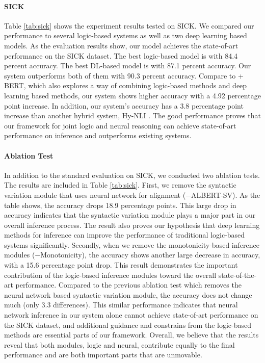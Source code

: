 \documentclass[11pt,a4paper]{article}
\begin{document}
\paragraph{SICK}
Table \ref{tab:sick} shows the experiment results tested on SICK. We compared our performance to several logic-based systems as well as two deep learning based models. As the evaluation results show, our model achieves the state-of-art performance on the SICK dataset. The best logic-based model is \citet{abzianidze-2020-learning} with 84.4 percent accuracy. The best DL-based model is \citet{yin-schutze-2017-task} with 87.1 percent accuracy. Our system outperforms both of them with 90.3 percent accuracy. Compare to \citet{hu-etal-2020-monalog} + BERT, which also explores a way of combining logic-based methods and deep learning based methods, our system shows higher accuracy with a 4.92 percentage point increase. In addition, our system's accuracy has a 3.8 percentage point increase than another hybrid system, Hy-NLI \cite{kalouli-etal-2020-hy}. The good performance proves that our framework for joint logic and neural reasoning can achieve state-of-art performance on inference and outperforms existing systems. 

\paragraph{Ablation Test} In addition to the standard evaluation on SICK, we conducted two ablation tests. The results are included in Table \ref{tab:sick}. First, we remove the syntactic variation module that uses neural network for alignment ($-$ALBERT-SV). As the table shows, the accuracy drops 18.9 percentage points. This large drop in accuracy indicates that the syntactic variation module plays a major part in our overall inference process. The result also proves our hypothesis that deep learning methods for inference can improve the performance of traditional logic-based systems significantly. Secondly, when we remove the monotonicity-based inference modules ($-$Monotonicity), the accuracy shows another large decrease in accuracy, with  a 15.6 percentage point drop. This result demonstrates the important contribution of the logic-based inference modules toward the overall state-of-the-art performance. Compared to the previous ablation test which removes the neural network based syntactic variation module, the accuracy does not change much (only 3.3 differences). This similar performance indicates that neural network inference in our system alone cannot achieve state-of-art performance on the SICK dataset, and additional guidance and constrains from the logic-based methods are essential parts of our framework. Overall, we believe that the results reveal that both modules, logic and neural, contribute equally to the final performance and are both important parts that are unmovable.    
\end{document}
